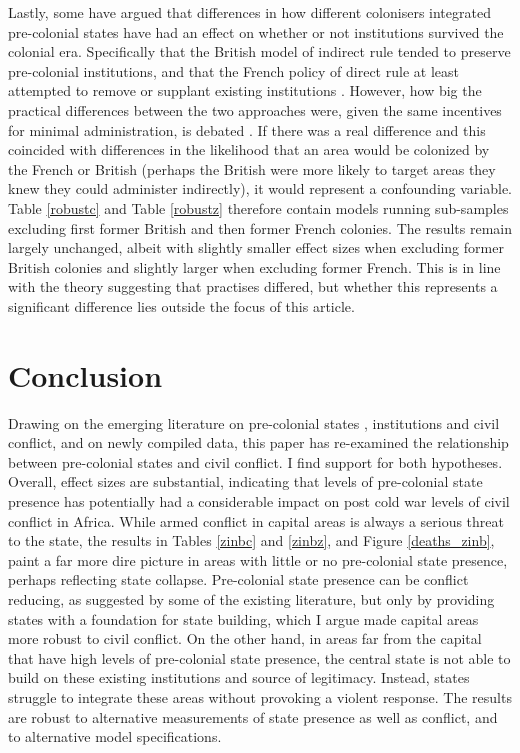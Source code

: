 Lastly, some have argued that differences in how different colonisers integrated
pre-colonial states have had an effect on whether or not institutions survived
the colonial era. Specifically that the British model of indirect rule tended to
preserve pre-colonial institutions, and that the French policy of direct rule at
least attempted to remove or supplant existing institutions \citep{Paine2019}.
However, how big the practical differences between the two approaches were,
given the same incentives for minimal administration, is debated
\citep{boone2014property, englebert2013inside}. If there was a real difference
and this coincided with differences in the likelihood that an area would be
colonized by the French or British (perhaps the British were more likely to
target areas they knew they could administer indirectly), it would represent a
confounding variable. Table \ref{robustc} and Table \ref{robustz} therefore
contain models running sub-samples excluding first former British and then
former French colonies. The results remain largely unchanged, albeit with
slightly smaller effect sizes when excluding former British colonies and
slightly larger when excluding former French. This is in line with the theory
suggesting that practises differed, but whether this represents a significant
difference lies outside the focus of this article.

\section{Conclusion} \label{Conclusion}

Drawing on the emerging literature on pre-colonial states \citep{Paine2019,
Depetris-Chauvin2016}, institutions \citep{Wig2016, Englebert2002,
Michalopoulos2018} and civil conflict, and on newly compiled data, this paper
has re-examined the relationship between pre-colonial states and civil conflict.
I find support for both hypotheses. Overall, effect sizes are substantial,
indicating that levels of pre-colonial state presence has potentially had a
considerable impact on post cold war levels of civil conflict in Africa. While
armed conflict in capital areas is always a serious threat to the state, the
results in Tables \ref{zinbc} and \ref{zinbz}, and Figure \ref{deaths_zinb},
paint a far more dire picture in areas with little or no pre-colonial state
presence, perhaps reflecting state collapse. Pre-colonial state presence can be
conflict reducing, as suggested by some of the existing literature, but only by
providing states with a foundation for state building, which I argue made
capital areas more robust to civil conflict. On the other hand, in areas far
from the capital that have high levels of pre-colonial state presence, the
central state is not able to build on these existing institutions and source of
legitimacy. Instead, states struggle to integrate these areas without provoking
a violent response. The results are robust to alternative measurements of state
presence as well as conflict, and to alternative model specifications.

